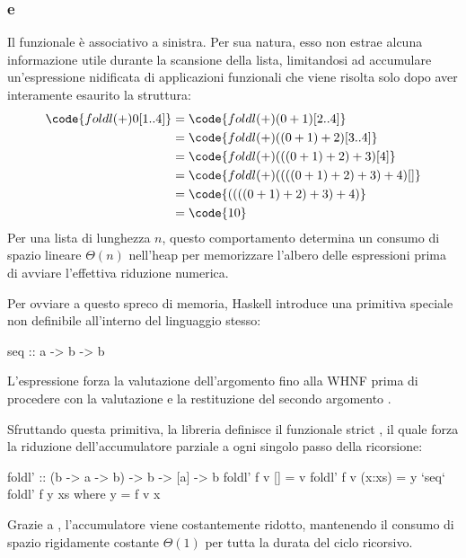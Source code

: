 \subsubsection{ e }
Il funzionale  è associativo a sinistra. Per sua natura, esso non estrae alcuna informazione utile durante la scansione della lista, limitandosi ad accumulare un'espressione nidificata di applicazioni funzionali che viene risolta solo dopo aver interamente esaurito la struttura:
\begin{align*}
    \code{foldl (+) 0 [1..4]} &= \code{foldl (+) (0+1) [2..4]} \\
    &= \code{foldl (+) ((0+1)+2) [3..4]} \\
    &= \code{foldl (+) (((0+1)+2)+3) [4]} \\
    &= \code{foldl (+) ((((0+1)+2)+3)+4) []} \\
    &= \code{((((0+1)+2)+3)+4)} \\
    &= \code{10}
\end{align*}
Per una lista di lunghezza $n$, questo comportamento determina un consumo di spazio lineare $\Theta(n)$ nell'heap per memorizzare l'albero delle espressioni prima di avviare l'effettiva riduzione numerica.

Per ovviare a questo spreco di memoria, Haskell introduce una primitiva speciale non definibile all'interno del linguaggio stesso:
\begin{haskellbox}{}
seq :: a -> b -> b
\end{haskellbox}
L'espressione  forza la valutazione dell'argomento  fino alla WHNF prima di procedere con la valutazione e la restituzione del secondo argomento .

Sfruttando questa primitiva, la libreria  definisce il funzionale strict , il quale forza la riduzione dell'accumulatore parziale a ogni singolo passo della ricorsione:
\begin{haskellbox}{}
foldl' :: (b -> a -> b) -> b -> [a] -> b
foldl' f v []     = v
foldl' f v (x:xs) = y `seq` foldl' f y xs
  where y = f v x
\end{haskellbox}
Grazie a , l'accumulatore viene costantemente ridotto, mantenendo il consumo di spazio rigidamente costante $\Theta(1)$ per tutta la durata del ciclo ricorsivo.

